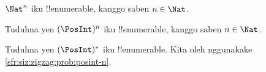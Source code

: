 \documentclass[../../../include/open-logic-section]{subfiles}
\begin{document}
\begin{prop}
$\Nat^n$ iku !!{enumerable}, kanggo saben $n \in \Nat$.
\end{prop}

\begin{prob}\label{sfr:siz:zigzag:prob:posint-n}
Tuduhna yen $(\PosInt)^n$ iku !!{enumerable}, kanggo saben $n \in \Nat$.
\end{prob}

\begin{prob}\label{sfr:siz:zigzag:prob:posint-star}
  Tuduhna yen $(\PosInt)^*$ iku !!{enumerable}. Kita oleh nggunakake \cref{sfr:siz:zigzag:prob:posint-n}.
\end{prob}
\end{document}
